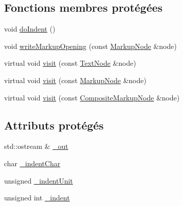 \subsection*{Fonctions membres protégées}
\begin{DoxyCompactItemize}
\item 
void \hyperlink{classxml_1_1_output_visitor_af369ea5f7984975e7dfdea89ddcae000}{doIndent} ()
\item 
void \hyperlink{classxml_1_1_output_visitor_a4008bcf393c484232ae20cc7dc97c0f0}{writeMarkupOpening} (const \hyperlink{classxml_1_1_markup_node}{MarkupNode} \&node)
\item 
virtual void \hyperlink{classxml_1_1_output_visitor_a33e53f866b31a155bbf29ffda852aaf7}{visit} (const \hyperlink{classxml_1_1_text_node}{TextNode} \&node)
\item 
virtual void \hyperlink{classxml_1_1_output_visitor_ac1dae5dbb561c4b7e98a761d5d503e49}{visit} (const \hyperlink{classxml_1_1_markup_node}{MarkupNode} \&node)
\item 
virtual void \hyperlink{classxml_1_1_output_visitor_addfc73ae3643a8285b5f892eff1a6066}{visit} (const \hyperlink{classxml_1_1_composite_markup_node}{CompositeMarkupNode} \&node)
\end{DoxyCompactItemize}
\subsection*{Attributs protégés}
\begin{DoxyCompactItemize}
\item 
std::ostream \& \hyperlink{classxml_1_1_output_visitor_ab2e31d8a9675f88d96a89399ea894e83}{\_\-out}
\item 
char \hyperlink{classxml_1_1_output_visitor_a9b89adad1ba1e3ff2f64ad7cd6545361}{\_\-indentChar}
\item 
unsigned \hyperlink{classxml_1_1_output_visitor_a55060d8246a1365089872aa4a500b03c}{\_\-indentUnit}
\item 
unsigned int \hyperlink{classxml_1_1_output_visitor_a7664b7975557ab6db96b744bf43190f4}{\_\-indent}
\end{DoxyCompactItemize}
